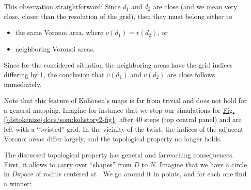 \documentclass[letterpaper,10pt,english]{jupyterBook}
\begin{document}
\sphinxAtStartPar
This observation straightforward: Since \(d_1\) and \(d_2\) are close (and we mean very close, closer than the resolution of the grid), then they must belong either to
\begin{itemize}
\item {} 
\sphinxAtStartPar
the same Voronoi area, where \(v(d_1)=v(d_2)\), or

\item {} 
\sphinxAtStartPar
neighboring Voronoi areas.

\end{itemize}

\sphinxAtStartPar
Since for the considered situation the neighboring areas have the grid indices differing by 1, the conclusion that \(v(d_1)\) and \(v(d_2)\) are close follows immediately.

\sphinxAtStartPar
Note that this feature of Kohonen’s maps is far from trivial and does not hold for a general mapping. Imagine for instance that we stop our simulations for \hyperref[\detokenize{docs/som:kohstory2-fig}]{Fig.\@ \ref{\detokenize{docs/som:kohstory2-fig}}} after 40 steps (top central panel) and are left with a “twisted” grid. In the vicinity of the twist, the indices of the adjacent Voronoi areas differ largely, and the topological property no longer holds.

\sphinxAtStartPar
The discussed topological property has general and far\sphinxhyphen{}reaching consequences. First, it allows to carry over “shapes” from \(D\) to \(N\). Imagine that we have a circle in \(D\)\sphinxhyphen{}space of radius  centered at . We go around it in  points, and for each one find a winner:
\end{document}
